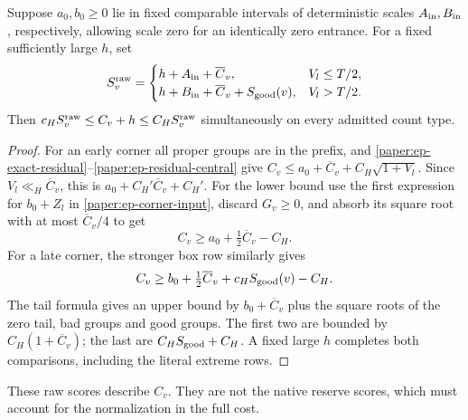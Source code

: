 \begin{lemma}\label{paper:ep-raw-scores}
Suppose $a_0,b_0\geq0$ lie in fixed comparable intervals of deterministic
scales $A_{\rm in},B_{\rm in}$, respectively, allowing scale zero for
an identically zero entrance.  For a fixed sufficiently large $h$, set
\[
 S_v^{\rm raw}=\begin{cases}
 h+A_{\rm in}+\overline C_v,&V_l\leq T/2,\\
 h+B_{\rm in}+\overline C_v+S_{\rm good}(v),&V_l>T/2.
 \end{cases}
\]
Then $c_HS_v^{\rm raw}\leq C_v+h\leq C_HS_v^{\rm raw}$
simultaneously on every admitted count type.
\end{lemma}
\begin{proof}
For an early corner all proper groups are in the prefix, and
\eqref{paper:ep-exact-residual}--\eqref{paper:ep-residual-central}
give
$C_v\leq a_0+\overline C_v+C_H\sqrt{1+V_l}$.
Since $V_l\ll_H\overline C_v$, this is
$a_0+C_H'\overline C_v+C_H'$.
For the lower bound use the first expression for $b_0+Z_l$ in
\eqref{paper:ep-corner-input}, discard $G_v\geq0$, and absorb its
square root with at most $\overline C_v/4$ to get
\begin{equation}\label{paper:ep-early-raw}
 C_v\geq a_0+\tfrac12\overline C_v-C_H.
\end{equation}
For a late corner, the stronger box row similarly gives
\begin{equation}\label{paper:ep-late-raw}
 C_v\geq b_0+\tfrac12\overline C_v
                         +c_HS_{\rm good}(v)-C_H.
\end{equation}
The tail formula gives an upper bound by
$b_0+\overline C_v$ plus the square roots of the zero tail, bad groups
and good groups.  The first two are bounded by $C_H(1+\overline C_v)$;
the last are $C_HS_{\rm good}+C_H$.  A fixed large $h$ completes both
comparisons, including the literal extreme rows.
\end{proof}
These raw scores describe $C_v$.  They are not the native reserve
scores, which must account for the normalization in the full cost.

